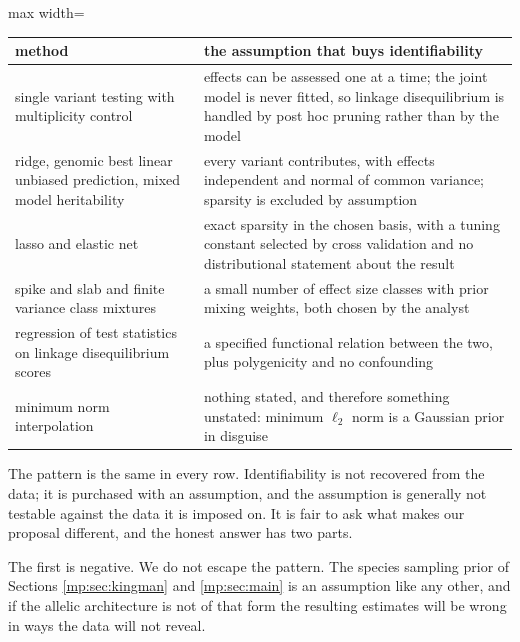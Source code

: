 \begin{center}
\begin{adjustbox}{max width=\textwidth}
\begin{tabular}{p{}p{}}
\toprule
method & the assumption that buys identifiability \\
\midrule
single variant testing with multiplicity control
 & effects can be assessed one at a time; the joint model is never fitted, so linkage
   disequilibrium is handled by post hoc pruning rather than by the model \\
ridge, genomic best linear unbiased prediction, mixed model heritability
 & every variant contributes, with effects independent and normal of common variance;
   sparsity is excluded by assumption \\
lasso and elastic net
 & exact sparsity in the chosen basis, with a tuning constant selected by cross validation
   and no distributional statement about the result \\
spike and slab and finite variance class mixtures
 & a small number of effect size classes with prior mixing weights, both chosen by the
   analyst \\
regression of test statistics on linkage disequilibrium scores
 & a specified functional relation between the two, plus polygenicity and no confounding \\
minimum norm interpolation
 & nothing stated, and therefore something unstated: minimum $\ell_2$ norm is a Gaussian
   prior in disguise \\
\bottomrule
\end{tabular}
\end{adjustbox}
\end{center}

The pattern is the same in every row. Identifiability is not recovered from the data; it is
purchased with an assumption, and the assumption is generally not testable against the data
it is imposed on. It is fair to ask what makes our proposal different, and the
honest answer has two parts.

The first is negative. We do not escape the pattern. The species sampling prior of Sections
\ref{mp:sec:kingman} and \ref{mp:sec:main} is an assumption like any other, and if the allelic
architecture is not of that form the resulting estimates will be wrong in ways the data will
not reveal.

